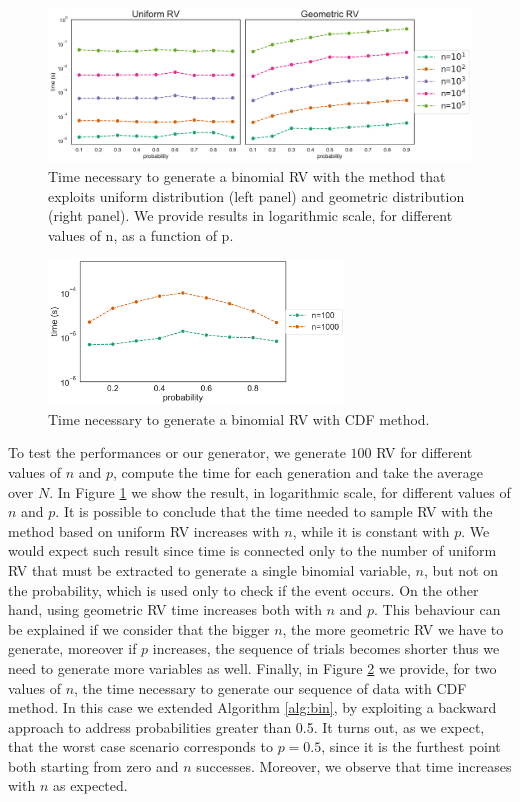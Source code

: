 \documentclass[twoside,onecolumn]{article}
\theoremstyle{definition}
\begin{document}
\begin{figure} \centering
         \includegraphics[width=\textwidth]{../results/binomial_time_unif_cdf.pdf}
\caption{Time necessary to generate a binomial RV with the method that exploits uniform distribution (left panel) and geometric distribution (right panel). We provide results in logarithmic scale, for different values of n, as a function of p.}\label{fig:bin}
\end{figure}

\begin{figure} \centering
         \includegraphics[width=0.7\textwidth]{../results/binomial_time_cdf.pdf}
\caption{Time necessary to generate a binomial RV with CDF method.}\label{fig:bin_cdf}
\end{figure}

To test the performances or our generator, we generate $100$ RV for different values of $n$ and $p$, compute the time for each generation and take the average over $N$.
In Figure \ref{fig:bin} we show the result, in logarithmic scale, for different values of $n$ and $p$. It is possible to conclude that the time needed to sample RV with the method based on uniform RV increases with $n$, while it is constant with $p$. We would expect such result since time is connected only to the number of uniform RV that must be extracted to generate a single binomial variable,  $n$, but not on the probability, which is used only to check if the event occurs.
On the other hand, using geometric RV time increases both with $n$ and $p$. This behaviour can be explained if we consider that the bigger $n$, the more geometric RV we have to generate, moreover if $p $ increases, the sequence of trials becomes shorter thus we need to generate more variables as well.
Finally, in Figure \ref{fig:bin_cdf} we provide, for two values of $n$, the time necessary to generate our sequence of data with CDF method. In this case we extended Algorithm \ref{alg:bin}, by exploiting a backward approach to address probabilities greater than 0.5. It turns out, as we expect, that the worst case scenario corresponds to $p=0.5$, since it is the furthest point both starting from 
zero and $n$ successes. Moreover, we observe that time increases with $n$ as expected.
\end{document}

